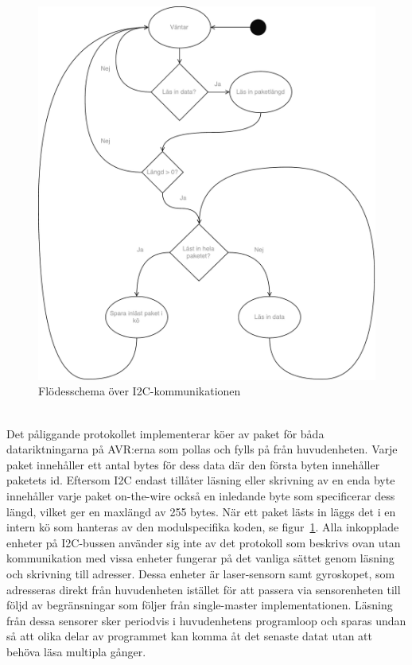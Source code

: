 \documentclass{article}
\begin{document}
\begin{figure}[H]
\centering
\includegraphics[scale=0.45]{Flodesschema_i2c}
\caption{Flödesschema över I2C-kommunikationen}
\label{fig:flodesschema_i2c}
\end{figure}
\ \\
Det påliggande protokollet implementerar köer av paket för båda datariktningarna på AVR:erna som pollas och fylls på från huvudenheten. Varje paket innehåller ett antal bytes för dess data där den första byten innehåller paketets id. Eftersom I2C endast tillåter läsning eller skrivning av en enda byte innehåller varje paket on-the-wire också en inledande byte som specificerar dess längd, vilket ger en maxlängd av 255 bytes. När ett paket lästs in läggs det i en intern kö som hanteras av den modulspecifika koden, se figur~\ref{fig:flodesschema_i2c}.
\newline\newline
Alla inkopplade enheter på I2C-bussen använder sig inte av det protokoll som beskrivs ovan utan kommunikation med vissa enheter fungerar på det vanliga sättet genom läsning och skrivning till adresser. Dessa enheter är laser-sensorn samt gyroskopet, som adresseras direkt från huvudenheten istället för att passera via sensorenheten till följd av begränsningar som följer från single-master implementationen. Läsning från dessa sensorer sker periodvis i huvudenhetens programloop och sparas undan så att olika delar av programmet kan komma åt det senaste datat utan att behöva läsa multipla gånger.
\end{document}
